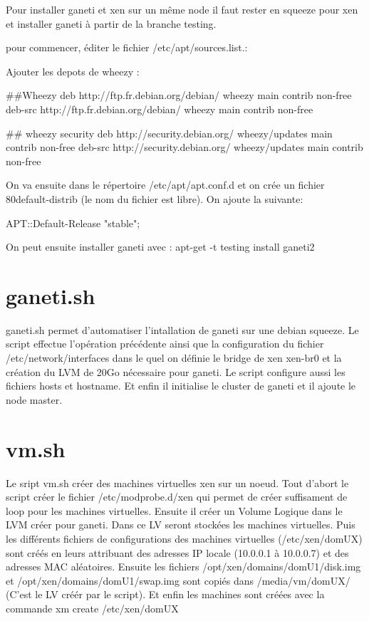 
Pour installer ganeti et xen sur un même node il faut rester en squeeze pour xen et installer ganeti à partir  de la branche testing.

pour commencer, éditer le fichier /etc/apt/sources.list.:

Ajouter les depots de wheezy :

##Wheezy
deb http://ftp.fr.debian.org/debian/ wheezy main contrib non-free
deb-src http://ftp.fr.debian.org/debian/ wheezy main contrib non-free

## wheezy security
deb http://security.debian.org/ wheezy/updates main contrib non-free
deb-src http://security.debian.org/ wheezy/updates main contrib non-free


On va ensuite dans le répertoire /etc/apt/apt.conf.d et on crée un fichier 80default-distrib (le nom du fichier est libre). On ajoute la  suivante:

APT::Default-Release "stable";

On peut ensuite installer ganeti avec :
apt-get -t testing install ganeti2

\section {ganeti.sh}

ganeti.sh permet d'automatiser l'intallation de ganeti sur une debian squeeze.
Le script effectue l'opération précédente ainsi que la configuration du fichier /etc/network/interfaces dans le quel on définie le bridge de xen xen-br0 et la création du LVM de 20Go nécessaire pour ganeti.
Le script configure aussi les fichiers hosts et hostname.
Et enfin il initialise le cluster de ganeti et il ajoute le node master.

\section {vm.sh}

Le sript vm.sh créer des machines virtuelles xen sur un noeud.
Tout d'abort le script créer le fichier /etc/modprobe.d/xen qui permet de créer suffisament de loop pour les machines virtuelles.
Ensuite il créer un Volume Logique dans le LVM créer pour ganeti. Dans ce LV seront stockées les machines virtuelles.
Puis les différents fichiers de configurations des machines virtuelles (/etc/xen/domUX) sont créés en leurs attribuant des adresses IP locale (10.0.0.1 à 10.0.0.7) et des adresses MAC aléatoires.
Ensuite les fichiers  /opt/xen/domains/domU1/disk.img et /opt/xen/domains/domU1/swap.img sont copiés dans /media/vm/domUX/ (C'est le LV créér par le script).
Et enfin les machines sont créées avec la commande xm create /etc/xen/domUX

